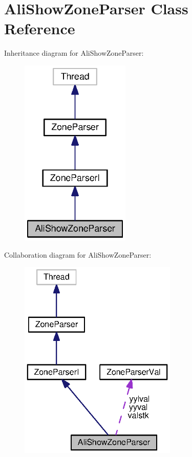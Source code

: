 \section{Ali\-Show\-Zone\-Parser Class Reference}
\label{classorg_1_1smallfoot_1_1parser_1_1zone_1_1AliShowZoneParser}


Inheritance diagram for Ali\-Show\-Zone\-Parser\-:\nopagebreak
\begin{figure}[H]
\begin{center}
\leavevmode
\includegraphics[width=148pt]{classorg_1_1smallfoot_1_1parser_1_1zone_1_1AliShowZoneParser__inherit__graph}
\end{center}
\end{figure}


Collaboration diagram for Ali\-Show\-Zone\-Parser\-:\nopagebreak
\begin{figure}[H]
\begin{center}
\leavevmode
\includegraphics[width=213pt]{classorg_1_1smallfoot_1_1parser_1_1zone_1_1AliShowZoneParser__coll__graph}
\end{center}
\end{figure}
